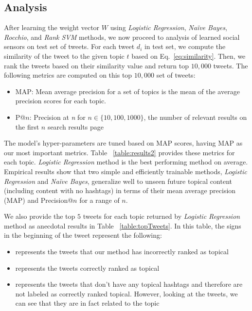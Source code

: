 \subsection{Analysis}
After learning the weight vector $W$ using \textit{Logistic Regression}, \textit{Na\"{i}ve Bayes}, \textit{Rocchio}, and \textit{Rank SVM} methods, we now proceed to analysis of learned social sensors on test set of tweets.
For each tweet $d_{i}$ in test set, we compute the similarity of the tweet to the given topic $t$ based on Eq.~\ref{eq:similarity}. Then, we rank the tweets based on their similarity value and return top $10,000$ tweets. The following metrics are computed on this top $10,000$ set of tweets:

\begin{itemize}
\item MAP: Mean average precision for a set of topics is the mean of the average precision scores for each topic.
\item P@$n$: Precision at \textit{n} for $n \in \{ 10, 100, 1000 \}$, the number of relevant results on the first $n$ search results page
\end{itemize}

The model's hyper-parameters are tuned based on MAP scores, having MAP as our most important metrics. Table ~\ref{table:results2} provides these metrics for each topic. \textit{Logistic Regression} method is the best performing method on average. Empirical results show that two simple and efficiently trainable methods, \textit{Logistic Regression} and \textit{Na\"{i}ve Bayes}, generalize well to unseen future topical content (including content with no hashtags) in terms of their mean average precision (MAP) and Precision@$n$ for a range of $n$.

We also provide the top $5$ tweets for each topic returned by \textit{Logistic Regression} method as anecdotal results in Table ~\ref{table:topTweets}. In this table, the signs in the beginning of the tweet represent the following:
\begin{itemize}
\item \xmark represents the tweets that our method has incorrectly ranked as topical
\item \checkmark represents the tweets correctly ranked as topical
\item \starmark represents the tweets that don't have any topical hashtags and therefore are not labeled as correctly ranked topical. However, looking at the tweets, we can see that they are in fact related to the topic
\end{itemize}  

